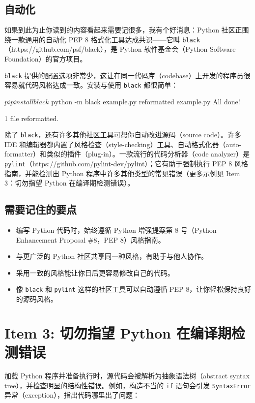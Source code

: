\subsection{自动化}

如果到此为止你读到的内容看起来需要记很多，我有个好消息：Python 社区正围绕一款通用的自动化 PEP 8 格式化工具达成共识——它叫 \texttt{black}（https://github.com/psf/black），是 Python 软件基金会（Python Software Foundation）的官方项目。

\texttt{black} 提供的配置选项非常少，这让在同一代码库（codebase）上开发的程序员很容易就代码风格达成一致。安装与使用 \texttt{black} 都很简单：

\begin{codebox}[python]
$ pip install black
$ python -m black example.py
reformatted example.py
All done!


1 file reformatted.
\end{codebox}

除了 \texttt{black}，还有许多其他社区工具可帮你自动改进源码（source code）。许多 IDE 和编辑器都内置了风格检查（style-checking）工具、自动格式化器（auto-formatter）和类似的插件（plug-in）。一款流行的代码分析器（code analyzer）是 \texttt{pylint}（https://github.com/pylint-dev/pylint）；它有助于强制执行 PEP 8 风格指南，并能检测出 Python 程序中许多其他类型的常见错误（更多示例见 Item 3：切勿指望 Python 在编译期检测错误）。

\subsection{需要记住的要点}

\begin{itemize}
\item 编写 Python 代码时，始终遵循 Python 增强提案第 8 号（Python Enhancement Proposal \#8，PEP 8）风格指南。
\item 与更广泛的 Python 社区共享同一种风格，有助于与他人协作。
\item 采用一致的风格能让你日后更容易修改自己的代码。
\item 像 \texttt{black} 和 \texttt{pylint} 这样的社区工具可以自动遵循 PEP 8，让你轻松保持良好的源码风格。
\end{itemize}

\section{Item 3: 切勿指望 Python 在编译期检测错误}

加载 Python 程序并准备执行时，源代码会被解析为抽象语法树（abstract syntax tree），并检查明显的结构性错误。例如，构造不当的 \texttt{if} 语句会引发 \texttt{SyntaxError} 异常（exception），指出代码哪里出了问题：

